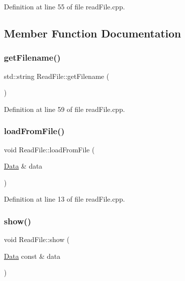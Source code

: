 Definition at line 55 of file read\+File.\+cpp.



\subsection{Member Function Documentation}
\mbox{\label{class_read_file_a9835264c9ec95cfdbc1349573402fc01}} 
\subsubsection{\texorpdfstring{get\+Filename()}{getFilename()}}
{\footnotesize\ttfamily std\+::string Read\+File\+::get\+Filename (\begin{DoxyParamCaption}{ }\end{DoxyParamCaption})}







Definition at line 59 of file read\+File.\+cpp.

\mbox{\label{class_read_file_a232df426223b84e4dbb3f964ee4c3177}} 
\subsubsection{\texorpdfstring{load\+From\+File()}{loadFromFile()}}
{\footnotesize\ttfamily void Read\+File\+::load\+From\+File (\begin{DoxyParamCaption}\item[{\mbox{\hyperlink{struct_data}{Data}} \&}]{data }\end{DoxyParamCaption})}







Definition at line 13 of file read\+File.\+cpp.

\mbox{\label{class_read_file_a5efc41b900510ae038dafc23a2563300}} 
\subsubsection{\texorpdfstring{show()}{show()}}
{\footnotesize\ttfamily void Read\+File\+::show (\begin{DoxyParamCaption}\item[{\mbox{\hyperlink{struct_data}{Data}} const \&}]{data }\end{DoxyParamCaption})}







